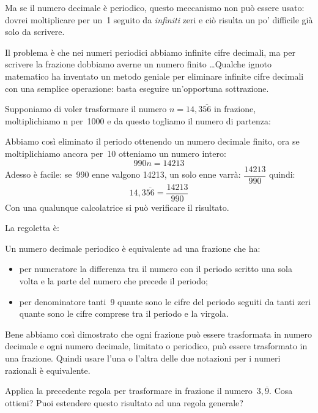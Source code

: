 Ma se il numero decimale è periodico, questo meccanismo non può essere 
usato: dovrei moltiplicare per un~1 seguito da \emph{infiniti} zeri e ciò 
risulta un po' difficile già solo da scrivere.

Il problema è che nei numeri periodici abbiamo infinite cifre decimali, ma 
per scrivere la frazione dobbiamo averne un numero finito \dots Qualche 
ignoto matematico ha inventato un metodo geniale per eliminare infinite 
cifre decimali con una semplice operazione: basta eseguire un'opportuna 
sottrazione.

Supponiamo di voler trasformare il numero \(n = 14,3\overline{56}\) in 
frazione, moltiplichiamo n per~1000 e da questo togliamo il numero di 
partenza:

\begin{center}
 \begin{center}\end{center}
\end{center}

Abbiamo così eliminato il periodo ottenendo un numero decimale finito, ora 
se moltiplichiamo ancora per~10 otteniamo un numero intero:
\[990n = 14213\]
Adesso è facile: se~990 enne valgono 14213, un solo enne varrà:
\(\dfrac{14213}{990}\)
quindi:
\[14,3\overline{56} = \frac{14213}{990}\]
Con una qualunque calcolatrice si può verificare il risultato.

La regoletta è:

\begin{teorema}
 Un numero decimale periodico è equivalente ad una frazione che ha:
\begin{itemize}
 \item per numeratore la differenza tra il numero con il periodo scritto 
una sola volta e la parte del numero che precede il periodo;
 \item per denominatore tanti~9 quante sono le cifre del periodo seguiti da 
tanti zeri quante sono le cifre comprese tra il periodo e la virgola.
\end{itemize}
\end{teorema}

Bene abbiamo così dimostrato che ogni frazione può essere trasformata in 
numero decimale e ogni numero decimale, limitato o periodico, può essere 
trasformato in una frazione. Quindi usare l'una o l'altra delle due 
notazioni per i numeri razionali è equivalente.

\begin{osservazione}
 Applica la precedente regola per trasformare in frazione il 
 numero~\(3,\overline{9}\). Cosa ottieni? Puoi estendere questo risultato 
ad una regola generale?
\end{osservazione}


